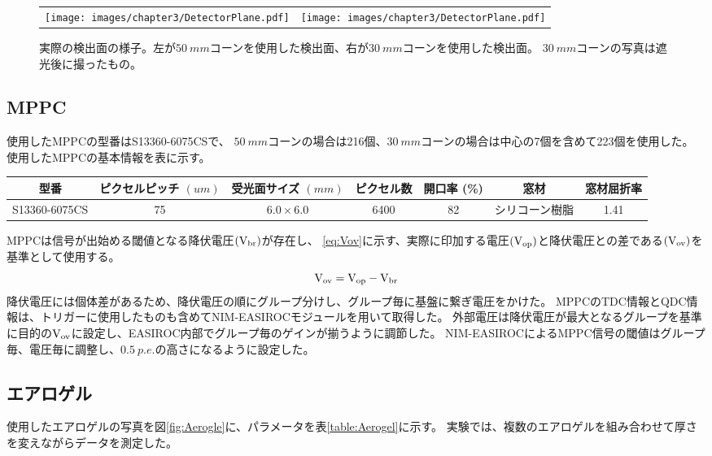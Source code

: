 \begin{figure}
  \begin{tabular}{cc}
    \begin{minipage}[t]{0.45\hsize}
      \centering
      \texttt{[image: images/chapter3/DetectorPlane.pdf]}
    \end{minipage}
    &
    \begin{minipage}[t]{0.45\hsize}
      \centering
      \texttt{[image: images/chapter3/DetectorPlane.pdf]}
    \end{minipage}
  \end{tabular}
  \caption{実際の検出面の様子。左が$\SI{50}{mm}$コーンを使用した検出面、右が$\SI{30}{mm}$コーンを使用した検出面。
    $\SI{30}{mm}$コーンの写真は遮光後に撮ったもの。
  }
  \label{fig:DetectorPlane}
\end{figure}

\subsection{MPPC}
使用したMPPCの型番はS13360-6075CSで、
$\SI{50}{mm}$コーンの場合は216個、$\SI{30}{mm}$コーンの場合は中心の7個を含めて223個を使用した。
使用したMPPCの基本情報を表に示す。
\begin{tabular}{ccccccc}
  型番 & ピクセルピッチ $(\si{um})$ & 受光面サイズ $(\si{mm})$ & ピクセル数 & 開口率 (\%) & 窓材 & 窓材屈折率\\
  \hline
  \hline
  S13360-6075CS & 75 & $6.0 \times 6.0$ & 6400 & 82 & シリコーン樹脂 & 1.41
  \label{tab:MPPC}
\end{tabular}
MPPCは信号が出始める閾値となる降伏電圧$(\rm{V_{br}})$が存在し、
\ref{eq:Vov}に示す、実際に印加する電圧$(\rm{V_{op}})$と降伏電圧との差である$(\rm{V_{ov}})$を基準として使用する。
\begin{equation}
  \rm{V_{ov}} = \rm{V_{op}} - \rm{V_{br}}
  \label{eq:Vov}
\end{equation}
降伏電圧には個体差があるため、降伏電圧の順にグループ分けし、グループ毎に基盤に繋ぎ電圧をかけた。
MPPCのTDC情報とQDC情報は、トリガーに使用したものも含めてNIM-EASIROCモジュール\cite{ref9}を用いて取得した。
外部電圧は降伏電圧が最大となるグループを基準に目的の$\rm{V_{ov}}$に設定し、EASIROC内部でグループ毎のゲインが揃うように調節した。
NIM-EASIROCによるMPPC信号の閾値はグループ毎、電圧毎に調整し、$\SI{0.5}{p.e.}$の高さになるように設定した。


\subsection{エアロゲル}
使用したエアロゲルの写真を図\ref{fig:Aerogle}に、パラメータを表\ref{table:Aerogel}に示す。
実験では、複数のエアロゲルを組み合わせて厚さを変えながらデータを測定した。


